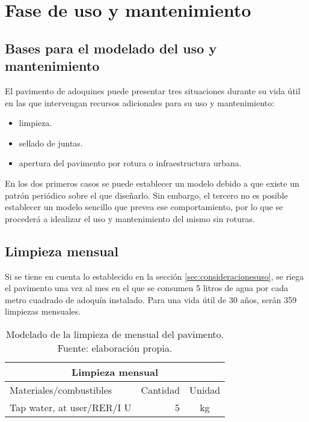 \section{Fase de uso y mantenimiento}\label{sec:faseusoymantenimiento}

\subsection{Bases para el modelado del uso y mantenimiento}
El pavimento de adoquines puede presentar tres situaciones durante su vida útil en las que intervengan recursos adicionales para su uso y mantenimiento:
\begin{itemize}
\item limpieza.
\item sellado de juntas.
\item apertura del pavimento por rotura o infraestructura urbana.
\end{itemize}

En los dos primeros casos se puede establecer un modelo debido a que existe un patrón periódico sobre el que diseñarlo. Sin embargo, el tercero no es posible establecer un modelo sencillo que prevea ese comportamiento, por lo que se procederá a idealizar el uso y mantenimiento del mismo sin roturas.

\subsection{Limpieza mensual}
Si se tiene en cuenta lo establecido en la sección \ref{sec:consideracionesuso}, se riega el pavimento una vez al mes en el que se consumen 5 litros de agua por cada metro cuadrado de adoquín instalado. Para una vida útil de 30 años, serán 359 limpiezas mensuales.

\begin{table}[!htb]
\centering
\begin{tabular}{p{8cm}rc}
\toprule
\multicolumn{3}{c}{Limpieza mensual}\\
\midrule
Materiales/combustibles & Cantidad & Unidad\\
\midrule
Tap water, at user/RER/I U & 5 & \si{kg}\\
\bottomrule
\end{tabular}
\caption[Modelado de la limpieza de mensual del pavimento.]{Modelado de la limpieza de mensual del pavimento. Fuente: elaboración propia.}
\label{modeladoagualimpiezamensual}
\end{table}


